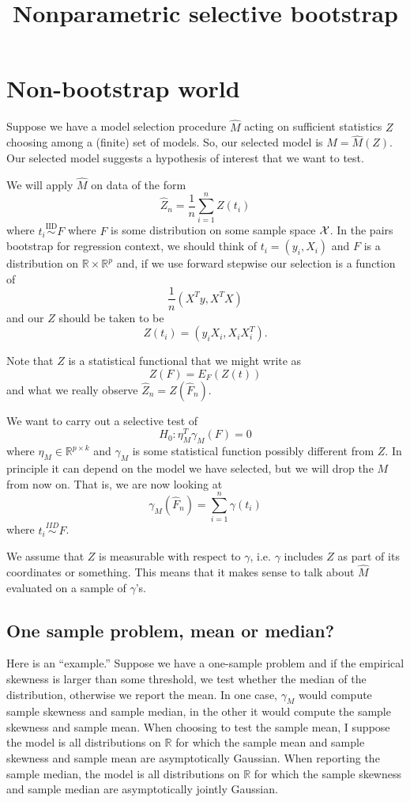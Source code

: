 \documentclass{article}
\newcommand{\real}{\mathbb{R}}
\begin{document}
\title{Nonparametric selective bootstrap}

\maketitle

\section{Non-bootstrap world}

Suppose we have a model selection procedure $\hat{M}$ acting on sufficient
statistics $Z$ choosing among a (finite) set of models. So, our selected model
is $M=\hat{M}(Z)$. Our selected model suggests a hypothesis of interest that we want to test.

We will apply $\hat{M}$ on data of the form
$$
\hat{Z}_n = \frac{1}{n} \sum_{i=1}^n Z(t_i) 
$$
where $t_i \overset{\text{IID}}{\sim} F$ where $F$
is some distribution on some sample space ${\cal X}$. In the pairs bootstrap for 
regression context, we should think of $t_i=(y_i, X_i)$ and $F$ 
is a distribution on $\real \times \real^p$ and, if we use
forward stepwise our
selection is a function of 
$$\frac{1}{n}(X^Ty, X^TX)$$
and our $Z$ should be taken to be
$$
Z(t_i) = (y_iX_i, X_iX_i^T).
$$

Note that $Z$ is a statistical functional that we might write as
$$
Z(F) = E_{F}(Z(t))
$$
and what we really observe $\hat{Z}_n = Z(\hat{F}_n)$. 

We want to carry out a selective test of
$$
H_0: \eta_{M}^T \gamma_M(F) = 0
$$
where $\eta_M \in \real^{p \times k}$ and $\gamma_M$ is some statistical
function possibly different from $Z$. In principle it can depend
on the model we have selected, but we will drop the $M$ from now on.
That is, we are now looking at
$$
\gamma_M(\hat{F}_n) = \sum_{i=1}^n \gamma(t_i)
$$
where $t_i \overset{IID}{\sim} F$.

We assume that $Z$ is measurable with respect to $\gamma$, i.e.
$\gamma$ includes $Z$ as part of its coordinates or something. This means
that it makes sense to talk about $\hat{M}$ evaluated
on a sample of $\gamma$'s.

\subsection{One sample problem, mean or median?}

Here is an ``example.''
Suppose we have a one-sample problem and if the empirical skewness
is larger than some threshold, we test whether the median of the 
distribution, otherwise we report the mean. In one case,
$\gamma_M$ would compute sample skewness and sample median, in the other
it would compute the sample skewness and sample mean. When choosing to test the sample mean, I suppose the model is all distributions on $\real$ for
which the sample mean and sample skewness and sample mean 
are asymptotically Gaussian. When
reporting the sample median, the model is all distributions on $\real$
for which the sample skewness and sample median are asymptotically jointly Gaussian.
\end{document}
